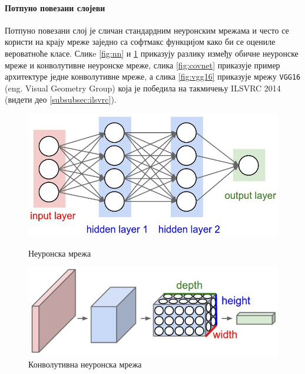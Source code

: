 \documentclass[a4paper]{article}
\begin{document}
\paragraph{Потпуно повезани слојеви}
Потпуно повезани слој је сличан стандардним неуронским мрежама и често се користи на крају мреже заједно
са софтмакс функцијом како би се оцениле вероватноће класе.
Сликe \ref{fig:nn} и \ref{fig:cnn} приказују разлику између обичне неуронске мреже и конволутивне неуронске мреже,
слика \ref{fig:covnet} приказује пример архитектуре једне конволутивне мреже,
а слика \ref{fig:vgg16} приказује мрежу \texttt{VGG16} (eng. Visual Geometry Group) која је победила на такмичењу ILSVRC 2014
(видети део \ref{subsubsec:ilsvrc}).

\label{subsec:arch}

\begin{figure}[!tbp]
    \centering
    \begin{minipage}[b]{0.45\textwidth}
        \includegraphics[width=\textwidth]{resources/neural_net}
        \caption{Неуронска мрежа}
        \label{fig:nn}
    \end{minipage}
    \hfill
    \begin{minipage}[b]{0.45\textwidth}
        \includegraphics[width=\textwidth]{resources/cnn}
        \caption{Конволутивна неуронска мрежа}
        \label{fig:cnn}
    \end{minipage}
\end{figure}
\end{document}
